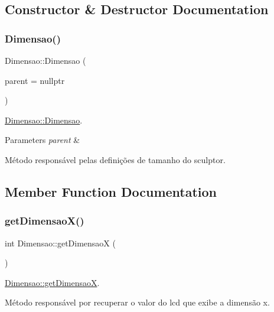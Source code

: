 \subsection{Constructor \& Destructor Documentation}
\mbox{\label{classDimensao_a628f34e3842d94b42fc81b30e5652705}} 
\subsubsection{\texorpdfstring{Dimensao()}{Dimensao()}}
{\footnotesize\ttfamily Dimensao\+::\+Dimensao (\begin{DoxyParamCaption}\item[{Q\+Widget $\ast$}]{parent = {\ttfamily nullptr} }\end{DoxyParamCaption})\hspace{0.3cm}{\ttfamily [explicit]}}



\mbox{\hyperlink{classDimensao_a628f34e3842d94b42fc81b30e5652705}{Dimensao\+::\+Dimensao}}. 


\begin{DoxyParams}{Parameters}
{\em parent} & \\
\hline
\end{DoxyParams}
Método responsável pelas definições de tamanho do sculptor. 

\subsection{Member Function Documentation}
\mbox{\label{classDimensao_a212470bd9d76fd1fb31ba816109045d2}} 
\subsubsection{\texorpdfstring{getDimensaoX()}{getDimensaoX()}}
{\footnotesize\ttfamily int Dimensao\+::get\+DimensaoX (\begin{DoxyParamCaption}{ }\end{DoxyParamCaption})}



\mbox{\hyperlink{classDimensao_a212470bd9d76fd1fb31ba816109045d2}{Dimensao\+::get\+DimensaoX}}. 

Método responsável por recuperar o valor do lcd que exibe a dimensão x. \mbox{\label{classDimensao_a5141fbeb3e622165a1b0a521c5974082}} 
